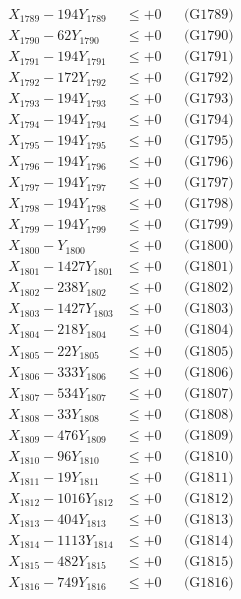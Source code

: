 \documentclass[a4paper,10pt]{article}
\begin{document}
{\begin{align}
X_{1789} - 194Y_{1789} &\leq +0 && \text{(G1789)} \\
X_{1790} - 62Y_{1790} &\leq +0 && \text{(G1790)} \\
\allowbreak
X_{1791} - 194Y_{1791} &\leq +0 && \text{(G1791)} \\
X_{1792} - 172Y_{1792} &\leq +0 && \text{(G1792)} \\
X_{1793} - 194Y_{1793} &\leq +0 && \text{(G1793)} \\
X_{1794} - 194Y_{1794} &\leq +0 && \text{(G1794)} \\
X_{1795} - 194Y_{1795} &\leq +0 && \text{(G1795)} \\
X_{1796} - 194Y_{1796} &\leq +0 && \text{(G1796)} \\
X_{1797} - 194Y_{1797} &\leq +0 && \text{(G1797)} \\
X_{1798} - 194Y_{1798} &\leq +0 && \text{(G1798)} \\
X_{1799} - 194Y_{1799} &\leq +0 && \text{(G1799)} \\
X_{1800} - Y_{1800} &\leq +0 && \text{(G1800)} \\
\allowbreak
X_{1801} - 1427Y_{1801} &\leq +0 && \text{(G1801)} \\
X_{1802} - 238Y_{1802} &\leq +0 && \text{(G1802)} \\
X_{1803} - 1427Y_{1803} &\leq +0 && \text{(G1803)} \\
X_{1804} - 218Y_{1804} &\leq +0 && \text{(G1804)} \\
X_{1805} - 22Y_{1805} &\leq +0 && \text{(G1805)} \\
X_{1806} - 333Y_{1806} &\leq +0 && \text{(G1806)} \\
X_{1807} - 534Y_{1807} &\leq +0 && \text{(G1807)} \\
X_{1808} - 33Y_{1808} &\leq +0 && \text{(G1808)} \\
X_{1809} - 476Y_{1809} &\leq +0 && \text{(G1809)} \\
X_{1810} - 96Y_{1810} &\leq +0 && \text{(G1810)} \\
\allowbreak
X_{1811} - 19Y_{1811} &\leq +0 && \text{(G1811)} \\
X_{1812} - 1016Y_{1812} &\leq +0 && \text{(G1812)} \\
X_{1813} - 404Y_{1813} &\leq +0 && \text{(G1813)} \\
X_{1814} - 1113Y_{1814} &\leq +0 && \text{(G1814)} \\
X_{1815} - 482Y_{1815} &\leq +0 && \text{(G1815)} \\
X_{1816} - 749Y_{1816} &\leq +0 && \text{(G1816)} \\

\end{align}}
\end{document}
